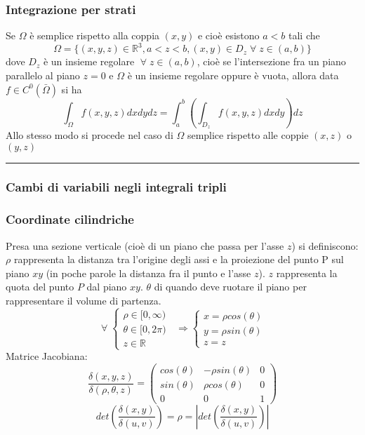\subsubsection*{Integrazione per strati}
Se $\Omega$ è semplice rispetto alla coppia $(x,y)$ e cioè esistono $a<b$ tali che
\[
    \Omega = \{(x,y,z) \in \mathbb{R}^3, a<z<b, (x,y) \in D_z \;\forall\;z \in(a,b)\}
\]
dove $D_z$ è un insieme regolare $\;\forall\;z \in(a,b)$, cioè se l'intersezione fra un piano parallelo al piano $z=0$ e $\Omega$ è un insieme regolare oppure è vuota, allora data $f \in C^0(\bar{\Omega})$ si ha 
\[
    \int_\Omega f(x,y,z) dxdydz = \int_{a}^{b}\left(\int_{D_z}f(x,y,z)dxdy\right)dz
\]
Allo stesso modo si procede nel caso di $\Omega$ semplice rispetto alle coppie $(x,z)$ o $(y,z)$\newline
\rule{\textwidth}{0,4pt}
\subsubsection*{Cambi di variabili negli integrali tripli}
\subsubsection*{Coordinate cilindriche}
Presa una sezione verticale (cioè di un piano che passa per l'asse $z$) si definiscono:\newline
$\rho$ rappresenta la distanza tra l'origine degli assi e la proiezione del punto P sul piano $xy$ (in poche parole la distanza fra il punto e l'asse $z$).\newline
$z$ rappresenta la quota del punto $P$ dal piano $xy$.\newline
$\theta$ di quando deve ruotare il piano per rappresentare il volume di partenza.
\[
    \;\forall\; \begin{cases}
        \rho \in [0,\infty)\\
        \theta \in [0,2\pi)\\
        z \in \mathbb{R}
    \end{cases} \;\; \Longrightarrow \begin{cases}
        x = \rho cos(\theta)\\
        y = \rho sin(\theta)\\
        z = z
    \end{cases}
\]
Matrice Jacobiana:
\[
    \frac{\delta(x,y,z)}{\delta(\rho,\theta,z)} = \left(
    \begin{matrix}
        cos(\theta) & -\rho sin(\theta) & 0\\ 
        sin(\theta) & \rho cos(\theta) & 0 \\ 
        0 & 0 & 1
    \end{matrix}\right)
\]
\[
    det(\frac{\delta(x,y)}{\delta(u,v)}) = \rho = \left|det(\frac{\delta(x,y)}{\delta(u,v)})\right|
\]
